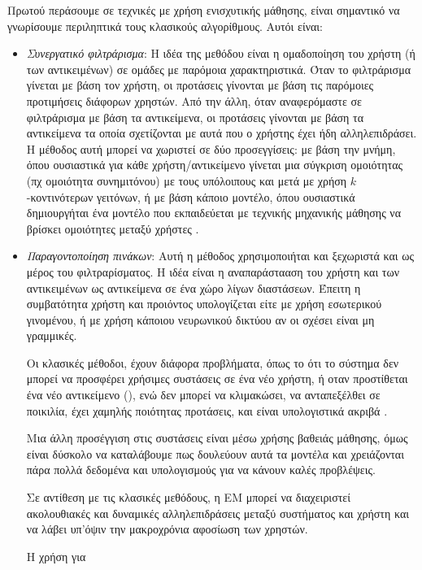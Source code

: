 Πρωτού περάσουμε σε τεχνικές με χρήση ενισχυτικής μάθησης, είναι σημαντικό να γνωρίσουμε περιληπτικά τους κλασικούς αλγορίθμους. Αυτόι είναι:
\begin{itemize}
    \item \textit{Συνεργατικό φιλτράρισμα}: Η ιδέα της μεθόδου είναι η ομαδοποίηση του χρήστη (ή των αντικειμένων) σε ομάδες με παρόμοια χαρακτηριστικά. Όταν το φιλτράρισμα γίνεται με βάση τον χρήστη, οι προτάσεις γίνονται με βάση τις παρόμοιες προτιμήσεις διάφορων χρηστών. Από την άλλη, όταν αναφερόμαστε σε φιλτράρισμα με βάση τα αντικείμενα, οι προτάσεις γίνονται με βάση τα αντικείμενα τα οποία σχετίζονται με αυτά που ο χρήστης έχει ήδη αλληλεπιδράσει. Η μέθοδος αυτή μπορεί να χωριστεί σε δύο προσεγγίσεις: με βάση την μνήμη, όπου ουσιαστικά για κάθε χρήστη/αντικείμενο γίνεται μια σύγκριση ομοιότητας (πχ ομοιότητα συνημιτόνου) με τους υπόλοιπους και μετά με χρήση $k$-κοντινότερων γειτόνων, ή με βάση κάποιο μοντέλο, όπου ουσιαστικά δημιουργήται ένα μοντέλο που εκπαιδεύεται με τεχνικής μηχανικής μάθησης να βρίσκει ομοιότητες μεταξύ χρήστες \cite{7872755}.
    \item \textit{Παραγοντοποίηση πινάκων}: Αυτή η μέθοδος χρησιμοποιήται και ξεχωριστά και ως μέρος του φιλτραρίσματος. Η ιδέα είναι η αναπαράστααση του χρήστη και των αντικειμένων ως αντικείμενα σε ένα χώρο λίγων διαστάσεων. Έπειτη η συμβατότητα χρήστη και προιόντος υπολογίζεται είτε με χρήση εσωτερικού γινομένου, ή με χρήση κάποιου νευρωνικού δικτύου αν οι σχέσει είναι μη γραμμικές. 

Οι κλασικές μέθοδοι, έχουν διάφορα προβλήματα, όπως το ότι το σύστημα δεν μπορεί να προσφέρει χρήσιμες συστάσεις σε ένα νέο χρήστη, ή οταν προστίθεται ένα νέο αντικείμενο (), ενώ δεν μπορεί να κλιμακώσει, να ανταπεξέλθει σε ποικιλία, έχει χαμηλής ποιότητας προτάσεις, και είναι υπολογιστικά ακριβά \cite{jannach_zanker_felfernig_friedrich_2010}.

Μια άλλη προσέγγιση στις συστάσεις είναι μέσω χρήσης βαθειάς μάθησης, όμως είναι δύσκολο να καταλάβουμε πως δουλεύουν αυτά τα μοντέλα και χρειάζονται πάρα πολλά δεδομένα και υπολογισμούς για να κάνουν καλές προβλέψεις.

Σε αντίθεση με τις κλασικές μεθόδους, η ΕΜ μπορεί να διαχειριστεί ακολουθιακές και δυναμικές αλληλεπιδράσεις μεταξύ συστήματος και χρήστη και να λάβει υπ'όψιν την μακροχρόνια αφοσίωση των χρηστών. 

Η χρήση  για 


\end{itemize}